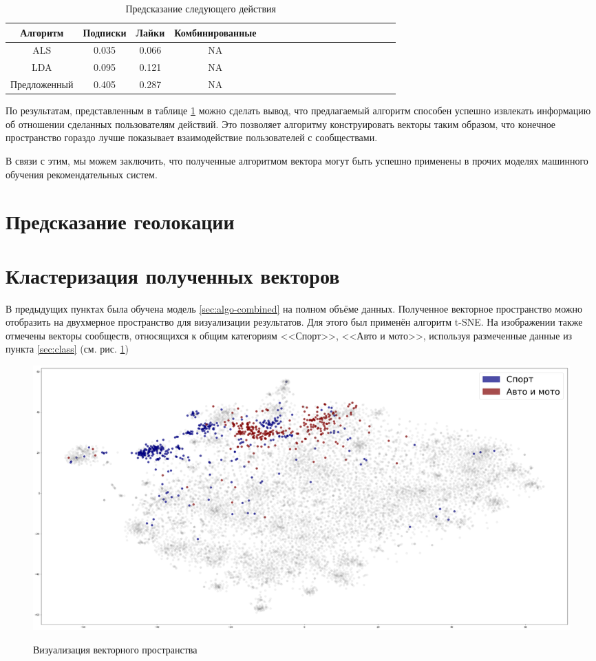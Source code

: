 \documentclass[times,specification,annotation]{itmo-student-thesis}
\begin{document}
\begin{table}[!h]
\caption{Предсказание следующего действия} \label{tab2-next-action}
\centering
\begin{tabular}{|*{18}{c|}}\hline
Алгоритм & Подписки & Лайки & Комбинированные \\\hline
ALS                        & 0.035 & 0.066  & NA \\\hline
LDA                       & 0.095 & 0.121  & NA\\\hline
Предложенный & 0.405 & 0.287 & NA \\\hline
\end{tabular}
\end{table}

По результатам, представленным в таблице \ref{tab2-next-action} можно сделать вывод, что предлагаемый алгоритм способен успешно извлекать информацию об отношении сделанных пользователям действий. Это позволяет алгоритму конструировать векторы таким образом, что конечное пространство гораздо лучше показывает взаимодействие пользователей с сообществами. 

В связи с этим, мы можем заключить, что полученные алгоритмом вектора могут быть успешно применены в прочих моделях машинного обучения рекомендательных систем.


\section{Предсказание геолокации} \label{sec:geo}


\section{Кластеризация полученных векторов}\label{sec:visual}

В предыдущих пунктах была обучена модель \ref{sec:algo-combined} на полном объёме данных. Полученное векторное пространство можно отобразить на двухмерное пространство для визуализации результатов. Для этого был применён алгоритм t-SNE. На изображении также отмечены векторы сообществ, относящихся к общим категориям <<Спорт>>, <<Авто и мото>>, используя размеченные данные из пункта \ref{sec:class} (см. рис. \ref{pic:categories})

\begin{figure}[h]
\caption{Визуализация векторного пространства}
\centering
\includegraphics[width=1\textwidth]{index0}
\label{pic:categories}
\end{figure}
\end{document}
